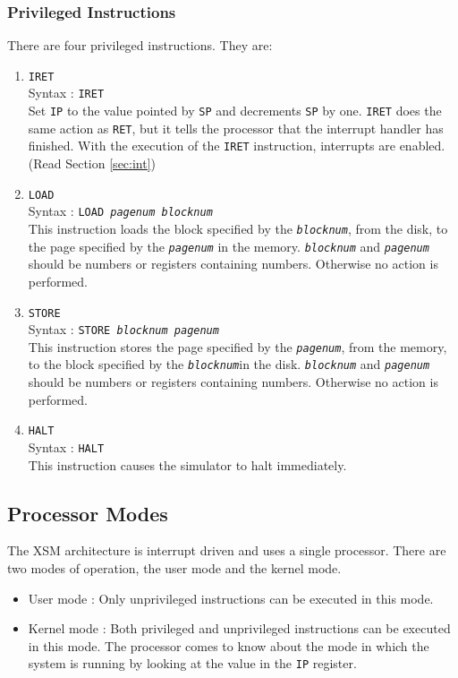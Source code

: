 \documentclass[11pt]{article}
\begin{document}
\subsubsection{Privileged Instructions}
There are four privileged instructions. They are:
\begin{enumerate}
\item \texttt{IRET}\\
Syntax : \texttt{IRET}\\

Set \texttt{IP} to the value pointed by \texttt{SP} and decrements \texttt{SP} by one. \texttt{IRET} does the same action as \texttt{RET}, but it tells the processor that the interrupt handler has finished. With the execution of the \texttt{IRET} instruction, interrupts are enabled. (Read Section \ref{sec:int})

\item \texttt{LOAD}\\
Syntax : \texttt{LOAD \textit{pagenum} \textit{blocknum}}\\
This instruction loads the block specified by the \texttt{\textit{blocknum}}, from the disk, to the page specified by the \texttt{\textit{pagenum}} in the memory. \texttt{\textit{blocknum}} and \texttt{\textit{pagenum}} should be numbers or registers containing numbers. Otherwise no action is performed.

\item \texttt{STORE}\\
Syntax : \texttt{STORE \textit{blocknum} \textit{pagenum} }\\ 
This instruction stores the page specified by the \texttt{\textit{pagenum}}, from the memory, to the block specified by the \texttt{\textit{blocknum}}in the disk. \texttt{\textit{blocknum}} and \texttt{\textit{pagenum}} should be numbers or registers containing numbers. Otherwise no action is performed.

\item \texttt{HALT}\\
Syntax : \texttt{HALT}\\
This instruction causes the simulator to halt immediately.
\end{enumerate}

\subsection{Processor Modes}
The XSM architecture is interrupt driven and uses a single processor. There are two modes of operation, the user mode and the kernel mode.
\begin{itemize}
\item User mode : Only unprivileged instructions can be executed in this mode.
\item Kernel mode : Both privileged and unprivileged instructions can be executed in this mode. The processor comes to know about the mode in which the system is running by looking at the value in the \texttt{IP} register.
\end{itemize}
\end{document}
